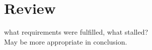\documentclass[main.tex]{subfiles}
\begin{document}
  
  \section{Review}
    what requirements were fulfilled, what stalled?\\
    May be more appropriate in conclusion.
  
\end{document}
